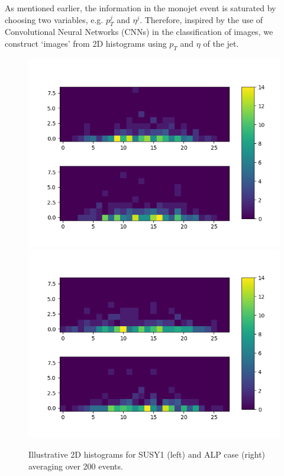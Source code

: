 \documentclass[prd,aps,letterpaper,floatfix,superscriptaddress,preprintnumbers,twocolumn,10pt,nofootinbib]{revtex4-1}
\begin{document}
As mentioned earlier, the information in the monojet event is saturated by choosing two variables, e.g. $p_T^j$ and $\eta^j$. Therefore, inspired by the use of Convolutional Neural Networks (CNNs) in the classification of images, we construct `images' from 2D histograms using $p_T$ and $\eta$ of the jet. 

\begin{figure}%
\centering
\includegraphics[scale=0.32]{figures/picsusybp1200eventscombo.png}
\includegraphics[scale=0.32]{figures/picaxion200eventscombo.png}
\caption{Illustrative 2D histograms for SUSY1 (left) and ALP case (right) averaging over 200 events.}\label{demopic}
\end{figure}
\end{document}
